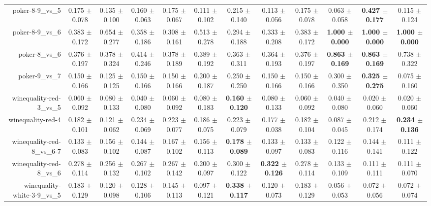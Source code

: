 \begin{table}[!ht]
{\begin{tabular}{r c c c c c c c c c c c}
poker-8-9\_vs\_5 & 0.175 $\pm$ 0.078 & 0.135 $\pm$ 0.100 & 0.160 $\pm$ 0.063 & 0.175 $\pm$ 0.067 & 0.111 $\pm$ 0.102 & 0.215 $\pm$ 0.140 & 0.113 $\pm$ 0.056 & 0.175 $\pm$ 0.078 & 0.063 $\pm$ 0.058 & \textbf{0.427 $\pm$ 0.177} & 0.115 $\pm$ 0.124 \\
poker-8-9\_vs\_6 & 0.383 $\pm$ 0.172 & 0.654 $\pm$ 0.277 & 0.358 $\pm$ 0.186 & 0.308 $\pm$ 0.161 & 0.513 $\pm$ 0.278 & 0.294 $\pm$ 0.188 & 0.333 $\pm$ 0.208 & 0.383 $\pm$ 0.172 & \textbf{1.000 $\pm$ 0.000} & \textbf{1.000 $\pm$ 0.000} & \textbf{1.000 $\pm$ 0.000} \\
poker-8\_vs\_6 & 0.376 $\pm$ 0.197 & 0.378 $\pm$ 0.324 & 0.414 $\pm$ 0.246 & 0.378 $\pm$ 0.189 & 0.389 $\pm$ 0.192 & 0.363 $\pm$ 0.311 & 0.364 $\pm$ 0.193 & 0.376 $\pm$ 0.197 & \textbf{0.863 $\pm$ 0.169} & \textbf{0.863 $\pm$ 0.169} & 0.738 $\pm$ 0.322 \\
poker-9\_vs\_7 & 0.150 $\pm$ 0.166 & 0.125 $\pm$ 0.125 & 0.150 $\pm$ 0.166 & 0.150 $\pm$ 0.166 & 0.200 $\pm$ 0.187 & 0.250 $\pm$ 0.250 & 0.150 $\pm$ 0.166 & 0.150 $\pm$ 0.166 & 0.300 $\pm$ 0.350 & \textbf{0.325 $\pm$ 0.275} & 0.075 $\pm$ 0.160 \\
winequality-red-3\_vs\_5 & 0.060 $\pm$ 0.092 & 0.080 $\pm$ 0.133 & 0.040 $\pm$ 0.080 & 0.060 $\pm$ 0.092 & 0.080 $\pm$ 0.183 & \textbf{0.160 $\pm$ 0.120} & 0.080 $\pm$ 0.133 & 0.060 $\pm$ 0.092 & 0.040 $\pm$ 0.080 & 0.020 $\pm$ 0.060 & 0.020 $\pm$ 0.060 \\
winequality-red-4 & 0.182 $\pm$ 0.101 & 0.121 $\pm$ 0.062 & 0.234 $\pm$ 0.069 & 0.223 $\pm$ 0.077 & 0.186 $\pm$ 0.075 & 0.223 $\pm$ 0.079 & 0.177 $\pm$ 0.038 & 0.182 $\pm$ 0.104 & 0.087 $\pm$ 0.045 & 0.212 $\pm$ 0.174 & \textbf{0.234 $\pm$ 0.136} \\
winequality-red-8\_vs\_6-7 & 0.133 $\pm$ 0.083 & 0.156 $\pm$ 0.102 & 0.144 $\pm$ 0.087 & 0.167 $\pm$ 0.102 & 0.156 $\pm$ 0.113 & \textbf{0.178 $\pm$ 0.089} & 0.133 $\pm$ 0.097 & 0.133 $\pm$ 0.083 & 0.122 $\pm$ 0.116 & 0.144 $\pm$ 0.141 & 0.111 $\pm$ 0.122 \\
winequality-red-8\_vs\_6 & 0.278 $\pm$ 0.114 & 0.256 $\pm$ 0.132 & 0.267 $\pm$ 0.102 & 0.267 $\pm$ 0.142 & 0.200 $\pm$ 0.097 & 0.300 $\pm$ 0.122 & \textbf{0.322 $\pm$ 0.126} & 0.278 $\pm$ 0.114 & 0.133 $\pm$ 0.109 & 0.111 $\pm$ 0.111 & 0.111 $\pm$ 0.070 \\
winequality-white-3-9\_vs\_5 & 0.183 $\pm$ 0.129 & 0.120 $\pm$ 0.098 & 0.128 $\pm$ 0.106 & 0.145 $\pm$ 0.113 & 0.097 $\pm$ 0.121 & \textbf{0.338 $\pm$ 0.117} & 0.120 $\pm$ 0.073 & 0.183 $\pm$ 0.129 & 0.056 $\pm$ 0.053 & 0.072 $\pm$ 0.056 & 0.072 $\pm$ 0.074 \\

\end{tabular}}
\end{table}
